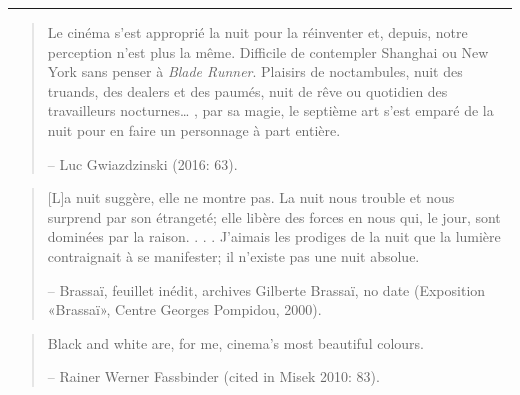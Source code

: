 \documentclass[
  letterpaper,
  DIV=11,
  numbers=noendperiod,
  oneside]{scrartcl}
\begin{document}
\begin{center}\rule{0.5\linewidth}{0.5pt}\end{center}

\begin{quote}
Le cinéma s'est approprié la nuit pour la réinventer et, depuis, notre
perception n'est plus la même. {}Difficile de contempler Shanghai ou New York sans
penser à \emph{Blade Runner}. Plaisirs de noctambules, nuit des truands,
des dealers et des paumés, nuit de rêve ou quotidien des travailleurs
nocturnes\ldots{} , par sa magie, le septième art s'est emparé de la
nuit pour en faire un personnage à part entière.

-- Luc Gwiazdzinski (2016: 63).
\end{quote}

\begin{quote}
{[}L{]}a nuit suggère, elle ne montre
pas.{} La nuit nous trouble
et nous surprend par son étrangeté; elle libère des forces en nous qui,
le jour, sont dominées par la raison. . . . J'aimais les prodiges de la
nuit que la lumière contraignait à se manifester; il n'existe pas une
nuit absolue.

-- Brassaï, feuillet inédit, archives Gilberte Brassaï, no date
(Exposition «Brassaï», Centre Georges Pompidou, 2000).
\end{quote}

\begin{quote}
Black and white are, for me, cinema's most beautiful colours.

-- Rainer Werner Fassbinder (cited in Misek 2010: 83).
\end{quote}
\end{document}
